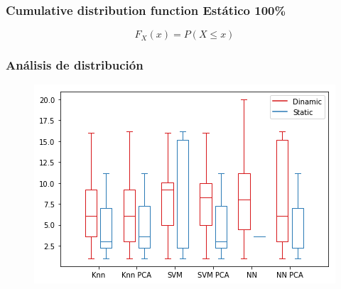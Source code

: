 \documentclass[handout]{beamer}
\begin{document}
\begin{frame}
\frametitle{Cumulative distribution function Estático 100\%}

$$
F_{X} (x) = P(X \le x)
$$

\begin{table}[!h]
\centering
{}
\end{table}

\end{frame}

\begin{frame}
\frametitle{Análisis de distribución}

\begin{figure}
\includegraphics[width=\textwidth]{../figures/boxplot.png}
\end{figure}

\end{frame}
\end{document}
